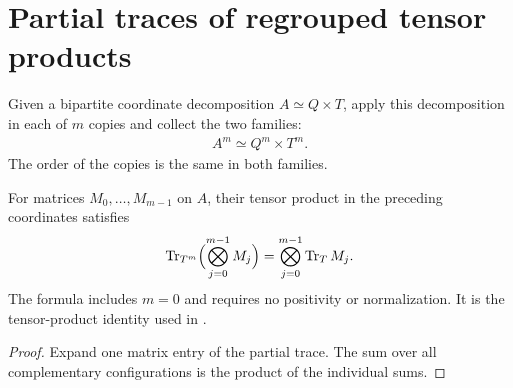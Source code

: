 \section{Partial traces of regrouped tensor products}
\label{sec:tensor_power_partial_trace}

\begin{definition}
\label{def:copies_product_equiv}
\leanok
Given a bipartite coordinate decomposition $A\simeq Q\times T$, apply
this decomposition in each of $m$ copies and collect the two families:
\begin{align*}
 A^m\simeq Q^m\times T^m.
\end{align*}
The order of the copies is the same in both families.
\end{definition}

\begin{theorem}
\label{thm:partial_trace_tensor_power_reindex}
\leanok
For matrices $M_0,\ldots,M_{m-1}$ on $A$, their tensor product in the
preceding coordinates satisfies
\begin{align*}
 \operatorname{Tr}_{T^m}\Bigl(\bigotimes_{j=0}^{m-1} M_j\Bigr)
 =\bigotimes_{j=0}^{m-1}\operatorname{Tr}_T M_j.
\end{align*}
The formula includes $m=0$ and requires no positivity or normalization.
It is the tensor-product identity used in
\cite[Section~8, lines~550--560]{OpenAI2026AreaLaw}.
\end{theorem}
\begin{proof}
\leanok
{}
Expand one matrix entry of the partial trace. The sum over all
complementary configurations is the product of the individual sums.
\end{proof}
